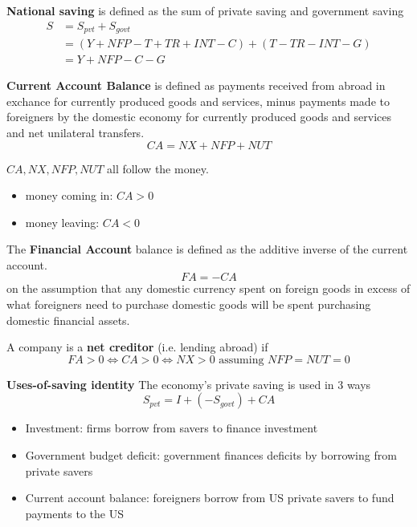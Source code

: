 \begin{definition}
    \textbf{National saving} is defined as the sum of private saving and government saving 
    \begin{align*}
        S &= S_{pvt} + S_{govt} \\
        &= (Y + NFP - T + TR + INT - C) + ( T - TR - INT - G) \\
        &= Y + NFP - C - G
    \end{align*}
\end{definition}

\begin{definition}
    \textbf{Current Account Balance} is defined as payments received from abroad in exchance for currently produced goods and services, minus payments made to foreigners by the domestic economy for currently produced goods and services and net unilateral transfers.
    \[
    CA = NX + NFP + NUT
    \]
\end{definition}

\begin{remark}
    $CA, NX, NFP, NUT$ all follow the money.
    \begin{itemize}
        \item money coming in: $CA > 0$
        \item money leaving: $CA < 0$
    \end{itemize} 
\end{remark}

\begin{definition}The \textbf{Financial Account} balance is defined as the additive inverse of the current account. 
    \[
        FA = - CA
    \] 
    on the assumption that any domestic currency spent on foreign goods in excess of what foreigners need to purchase domestic goods will be spent purchasing domestic financial assets.
\end{definition}
\begin{remark}
    A company is a \textbf{net creditor} (i.e. lending abroad) if 
    \[
        FA > 0 \iff CA > 0 \iff NX > 0 \text{ assuming } NFP = NUT = 0
    \]
\end{remark}


\begin{theorem}
    \textbf{Uses-of-saving identity} The economy's private saving is used in 3 ways 
    \[
        S_{pvt} = I + (- S_{govt}) + CA
    \]
    \begin{itemize}
        \item Investment: firms borrow from savers to finance investment
        \item Government budget deficit: government finances deficits by borrowing from private savers
        \item Current account balance: foreigners borrow from US private savers to fund payments to the US
    \end{itemize} 
\end{theorem}

